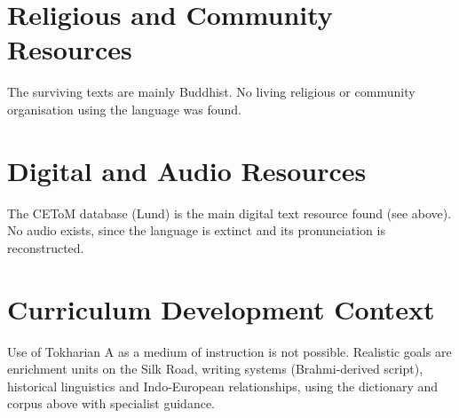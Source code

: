 \documentclass[12pt]{article}
\begin{document}
\section{Religious and Community Resources}
The surviving texts are mainly Buddhist. No living religious or community organisation using the language was found.

\section{Digital and Audio Resources}
The CEToM database (Lund) is the main digital text resource found (see above). No audio exists, since the language is extinct and its pronunciation is reconstructed.

\section{Curriculum Development Context}
Use of Tokharian A as a medium of instruction is not possible. Realistic goals are enrichment units on the Silk Road, writing systems (Brahmi-derived script), historical linguistics and Indo-European relationships, using the dictionary and corpus above with specialist guidance.
\end{document}
